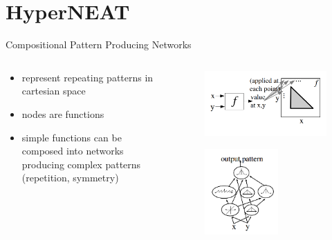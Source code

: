 \documentclass{beamer}
\begin{document}
\section{HyperNEAT}
\begin{frame}{Compositional Pattern Producing Networks}
    \begin{columns}
        \begin{column}{0.5\textwidth} \begin{itemize}
                \item represent repeating patterns in cartesian space
                \item nodes are functions
                \item simple functions can be composed into networks producing complex patterns (repetition, symmetry)           \end{itemize}\end{column}
        \begin{column}{0.5\textwidth}
            \begin{figure}[c]
                \includegraphics[width=\textwidth]{img/function.png}
            \end{figure}
            \begin{figure}[c]
                \includegraphics[width=0.6\textwidth]{img/CPNN.png}
            \end{figure}
        \end{column}
    \end{columns}
\end{frame}
\end{document}
